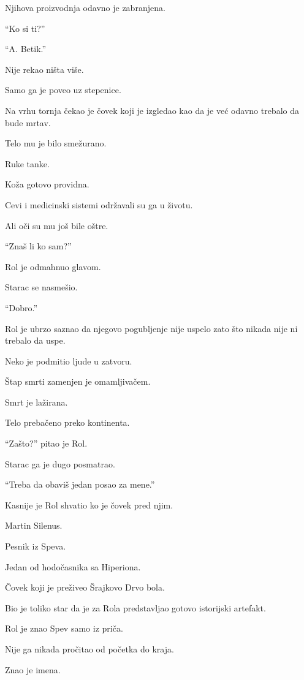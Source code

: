 Njihova proizvodnja odavno je zabranjena.

``Ko si ti?''

``A. Betik.''

Nije rekao ništa više.

Samo ga je poveo uz stepenice.

\bigskip

Na vrhu tornja čekao je čovek koji je izgledao kao da je već odavno trebalo da bude mrtav.

Telo mu je bilo smežurano.

Ruke tanke.

Koža gotovo providna.

Cevi i medicinski sistemi održavali su ga u životu.

Ali oči su mu još bile oštre.

``Znaš li ko sam?''

Rol je odmahnuo glavom.

Starac se nasmešio.

``Dobro.''

\bigskip

Rol je ubrzo saznao da njegovo pogubljenje nije uspelo zato što nikada nije ni trebalo da uspe.

Neko je podmitio ljude u zatvoru.

Štap smrti zamenjen je omamljivačem.

Smrt je lažirana.

Telo prebačeno preko kontinenta.

\bigskip

``Zašto?'' pitao je Rol.

Starac ga je dugo posmatrao.

``Treba da obaviš jedan posao za mene.''

\bigskip

Kasnije je Rol shvatio ko je čovek pred njim.

Martin Silenus.

Pesnik iz Speva.

Jedan od hodočasnika sa Hiperiona.

Čovek koji je preživeo Šrajkovo Drvo bola.

Bio je toliko star da je za Rola predstavljao gotovo istorijski artefakt.

\bigskip

Rol je znao Spev samo iz priča.

Nije ga nikada pročitao od početka do kraja.

Znao je imena.

